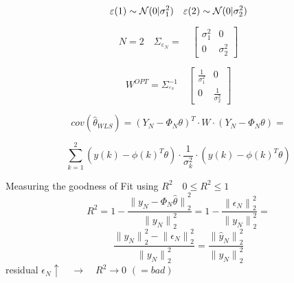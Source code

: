 \begin{tcolorbox}[colback=red!5!white,colframe=red!75!black,title=Example LLS]
\begin{equation*}
\varepsilon (1) \sim  { \cal{N} }(0|\sigma ^{ 2 }_{ 1 }) \quad \varepsilon (2) \sim  { \cal{N} }(0|\sigma ^{ 2 }_{ 2 })
\end{equation*}

\begin{equation*}
N=2 \quad { \Sigma  }_{ { \varepsilon  }_{ N } }=\quad \begin{bmatrix} \sigma _{ 1 }^{ 2 } & 0 \\ 0 & \sigma _{ 2 }^{ 2 } \end{bmatrix}
\end{equation*}

\begin{equation*}
W^{ OPT } = \Sigma _{ ^{ \varepsilon_{ N } } }^{ -1 }\quad \begin{bmatrix} \frac { 1 }{ \sigma _{ 1 }^{ 2 } }  & 0 \\ 0 & \frac { 1 }{ \sigma _{ 2 }^{ 2 } }  \end{bmatrix}
\end{equation*}

\begin{equation*}
cov({ \hat { \theta  } _{ WLS } }){ =({ Y }_{ N }-{ \Phi  }_{ N }\theta ) }^{ T }\cdot W\cdot ({ Y }_{ N }-{ \Phi  }_{ N }\theta )=
\end{equation*}

\begin{equation*}
\sum _{ k=1 }^{ 2 }{ (y(k)-{ \phi (k) }^{ T }\theta )\cdot \frac { 1 }{ { \sigma  }_{ k }^{ 2 } } \cdot (y(k)-{ \phi (k) }^{ T }\theta ) } 
\end{equation*}


Measuring the goodness of Fit using \({R}^{2} \quad 0\le {R}^{2} \le1\) 
\begin{equation*}
{ R }^{ 2 }=1-\frac { { \parallel { y }_{ N }-{ \Phi  }_{ N }\hat { \theta  } \parallel  }_{ 2 }^{ 2 } }{ { \parallel { y }_{ N }\parallel  }_{ 2 }^{ 2 } } =1-\frac { { \parallel { \epsilon  }_{ N }\parallel  }_{ 2 }^{ 2 } }{ { \parallel { y }_{ N }\parallel  }_{ 2 }^{ 2 } } =
\end{equation*}
\begin{equation*}
\frac { { \parallel { y }_{ N }\parallel  }_{ 2 }^{ 2 }-{ \parallel { \epsilon  }_{ N }\parallel  }_{ 2 }^{ 2 } }{ { \parallel { y }_{ N }\parallel  }_{ 2 }^{ 2 } } =\frac { { \parallel { \hat { y  }  }_{ N }\parallel  }_{ 2 }^{ 2 } }{ { \parallel { y }_{ N }\parallel  }_{ 2 }^{ 2 } } 
\end{equation*}
residual $ \epsilon_{N} \uparrow \quad \rightarrow \quad R^{2} \rightarrow 0 \,\,(= bad)$
\tcblower


\end{tcolorbox}

